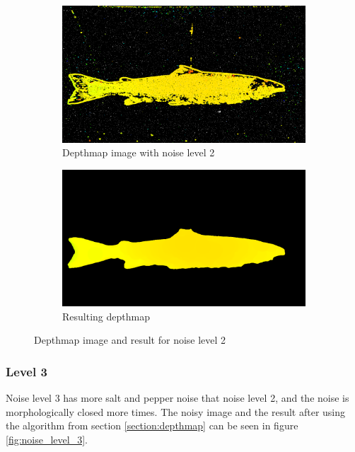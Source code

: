 \begin{figure}[h]
    \centering
    \begin{subfigure}{\textwidth}
        \centering
        \includegraphics[width=.7\linewidth]{images/implementation/noise_level_2/1_original}
        \caption{Depthmap image with noise level 2} 
        \label{fig:noise_level_2_original}
    \end{subfigure}\hspace*{\fill}
    
    \medskip
    \begin{subfigure}{\textwidth}
        \centering
        \includegraphics[width=.7\linewidth]{images/implementation/noise_level_2/7_median_filter}
        \caption{Resulting depthmap} 
        \label{fig:noise_level_2_result}
    \end{subfigure}\hspace*{\fill}
    \caption{Depthmap image and result for noise level 2}
    \label{fig:noise_level_2}
\end{figure}


\subsubsection{Level 3}

Noise level 3 has more salt and pepper noise that noise level 2, and the noise is morphologically closed more times. The noisy image and the result after using the algorithm from section \ref{section:depthmap} can be seen in figure \ref{fig:noise_level_3}.

